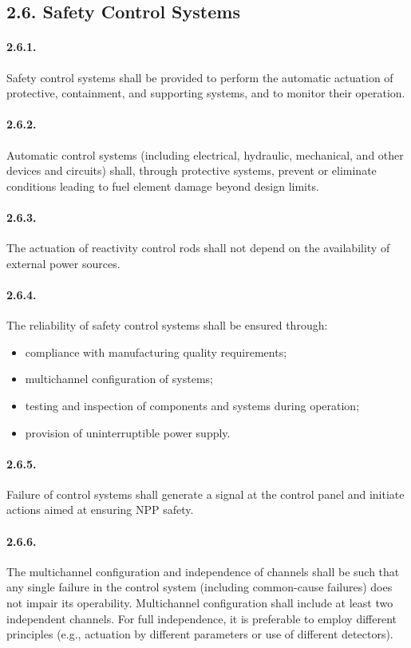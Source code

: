 \documentclass[openright]{bookest}
\begin{document}
\subsection*{2.6. Safety Control Systems}

\paragraph{2.6.1.}
Safety control systems shall be provided to perform the automatic actuation of protective, containment, and supporting systems, and to monitor their operation.

\paragraph{2.6.2.}
Automatic control systems (including electrical, hydraulic, mechanical, and other devices and circuits) shall, through protective systems, prevent or eliminate conditions leading to fuel element damage beyond design limits.

\paragraph{2.6.3.}
The actuation of reactivity control rods shall not depend on the availability of external power sources.

\paragraph{2.6.4.}
The reliability of safety control systems shall be ensured through:
\begin{itemize}
    \item compliance with manufacturing quality requirements;
    \item multichannel configuration of systems;
    \item testing and inspection of components and systems during operation;
    \item provision of uninterruptible power supply.
\end{itemize}

\paragraph{2.6.5.}
Failure of control systems shall generate a signal at the control panel and initiate actions aimed at ensuring NPP safety.

\paragraph{2.6.6.}
The multichannel configuration and independence of channels shall be such that any single failure in the control system (including common-cause failures) does not impair its operability.  
Multichannel configuration shall include at least two independent channels. For full independence, it is preferable to employ different principles (e.g., actuation by different parameters or use of different detectors).
\end{document}
